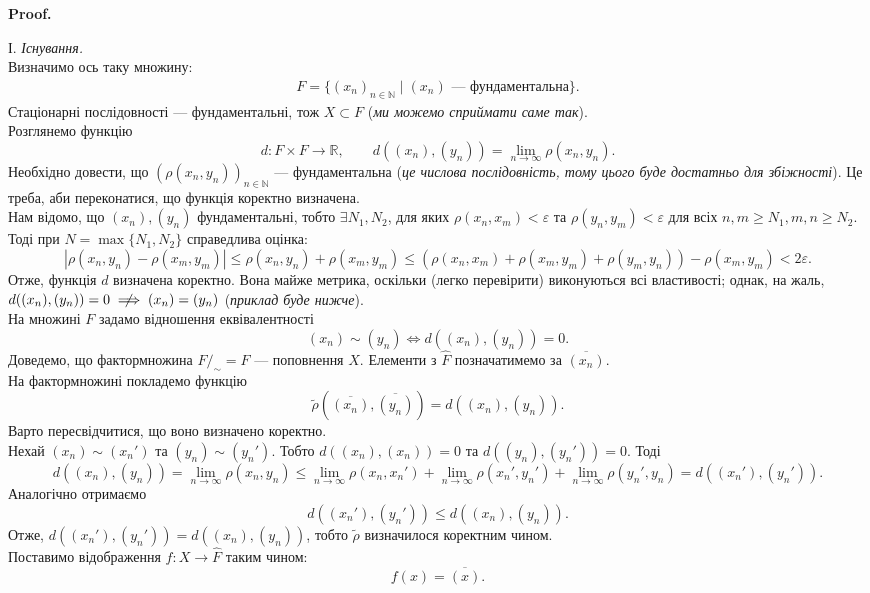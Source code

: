 \documentclass[a4paper, 10pt]{article}
\makeatletter
\theoremstyle{theoremdd}
\theoremstyle{theoremdd}
\theoremstyle{theoremdd}
\theoremstyle{theoremdd}
\theoremstyle{theoremdd}
\theoremstyle{theoremdd}
\theoremstyle{theoremdd}
\theoremstyle{theoremdd}
\renewenvironment{proof}[1][Proof.\\]{\par
\pushQED{\hfill \qed}%
\normalfont \topsep6\p@\@plus6\p@\relax
\trivlist
\item\relax
{\bfseries
#1\@addpunct{.}}\hspace\labelsep\ignorespaces
}{%
\popQED\endtrivlist\@endpefalse
}
\makeatother
\begin{document}
\begin{proof}
І. \textit{Існування.}\\
Визначимо ось таку множину:
\begin{align*}
F = \{ (x_n)_{n \in \mathbb{N}} \mid (x_n) \text{ --- фундаментальна} \}.
\end{align*}
Стаціонарні послідовності --- фундаментальні, тож $X \subset F$ (\textit{ми можемо сприймати саме так}).\\
Розглянемо функцію
\[
d \colon F \times F \to \mathbb{R}, \qquad d((x_n),(y_n)) = \displaystyle\lim_{n \to \infty} \rho(x_n,y_n).
\]
Необхідно довести, що $(\rho(x_n,y_n))_{n \in \mathbb{N}}$ --- фундаментальна (\textit{це числова послідовність, тому цього буде достатньо для збіжності}). Це треба, аби переконатися, що функція коректно визначена.\\
Нам відомо, що $(x_n), (y_n)$ фундаментальні, тобто $\exists N_1, N_2$, для яких $\rho(x_n,x_m) < \varepsilon$ та $\rho(y_n,y_m) < \varepsilon$ для всіх $n,m \geq N_1, m,n \geq N_2$. Тоді при $N = \max \{N_1,N_2\}$ справедлива оцінка:
\[
|\rho(x_n,y_n) - \rho(x_m,y_m)| \leq \rho(x_n,y_n) + \rho(x_m,y_m) \leq (\rho(x_n,x_m) + \rho(x_m,y_m) + \rho(y_m,y_n)) - \rho(x_m,y_m) < 2 \varepsilon.
\]
Отже, функція $d$ визначена коректно. Вона майже метрика, оскільки (легко перевірити) виконуються всі властивості; однак, на жаль, $d((x_n),(y_n)) = 0 \centernot\implies (x_n) = (y_n)$ (\textit{приклад буде нижче}).\\
На множині $F$ задамо відношення еквівалентності 
\[
(x_n) \sim (y_n) \iff d((x_n),(y_n)) = 0.
\]
Доведемо, що фактормножина $F/_{\sim} = \hat{F}$ --- поповнення $X$. Елементи з $\hat{F}$ позначатимемо за $\overline{(x_n)}$. \\
На фактормножині покладемо функцію
\[
\tilde{\rho}\left(\overline{(x_n)},\overline{(y_n)}\right) = d((x_n),(y_n)).
\]
Варто пересвідчитися, що воно визначено коректно.\\
Нехай $(x_n) \sim (x_n')$ та $(y_n) \sim (y_n')$. Тобто $d((x_n),(x_n)) = 0$ та $d((y_n),(y_n')) = 0$. Тоді
\[
d((x_n),(y_n)) = \displaystyle\lim_{n \to \infty} \rho(x_n,y_n) \leq \lim_{n \to \infty} \rho(x_n,x_n') + \lim_{n \to \infty} \rho(x_n',y_n') + \lim_{n \to \infty} \rho(y_n',y_n) = d((x_n'),(y_n')).
\]
Аналогічно отримаємо 
\[
d((x_n'),(y_n')) \leq d((x_n),(y_n)).
\]
Отже, $d((x_n'),(y_n')) = d((x_n),(y_n))$, тобто $\tilde{\rho}$ визначилося коректним чином.\\
Поставимо відображення $f \colon X \to \hat{F}$ таким чином:
\[
f(x) = \overline{(x)}.
\]

\end{proof}
\end{document}
